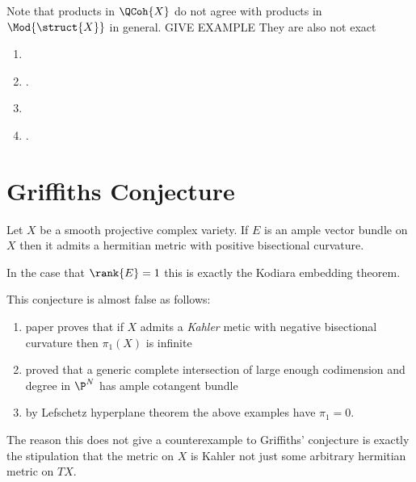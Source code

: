 \documentclass[12pt]{article}
\begin{document}
\begin{rmk}
Note that products in $\QCoh{X}$ do not agree with products in $\Mod{\struct{X}}$ in general. GIVE EXAMPLE They are also not exact 
\end{rmk}

\begin{enumerate}
\item {}
\item {}.

\item {}

\item {}.
\end{enumerate}

\section{Griffiths Conjecture}

\begin{conj}
Let $X$ be a smooth projective complex variety. If $E$ is an ample vector bundle on $X$ then it admits a hermitian metric with positive bisectional curvature.
\end{conj}

\begin{rmk}
In the case that $\rank{E} = 1$ this is exactly the Kodiara embedding theorem. 
\end{rmk}

\begin{rmk}
This conjecture is almost false as follows: 
\begin{enumerate}
\item {} paper proves that if $X$ admits a \textit{Kahler} metic with negative bisectional curvature then $\pi_1(X)$ is infinite
\item {} proved that a generic complete intersection of large enough codimension and degree in $\P^N$ has ample cotangent bundle
\item by Lefschetz hyperplane theorem the above examples have $\pi_1 = 0$. 
\end{enumerate}
The reason this does not give a counterexample to Griffiths' conjecture is exactly the stipulation that the metric on $X$ is Kahler not just some arbitrary hermitian metric on $T X$. 
\end{rmk}
\end{document}
